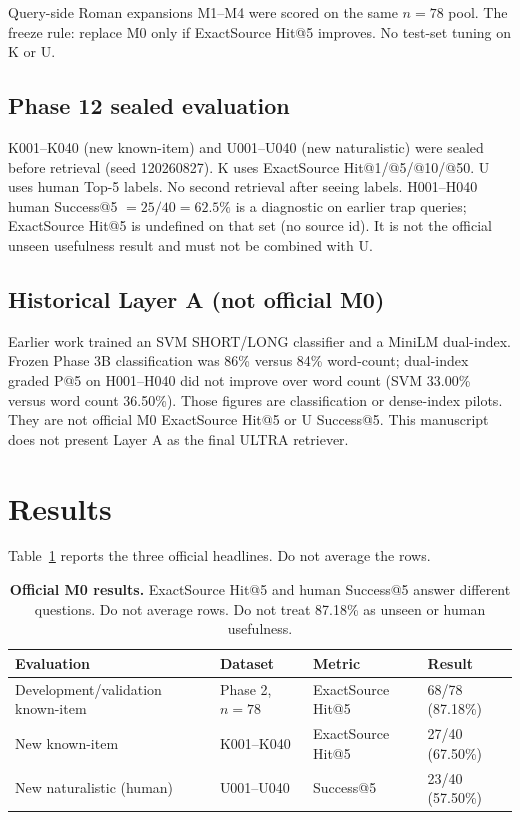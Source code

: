 \documentclass[10pt,letterpaper]{article}
\begin{document}
Query-side Roman expansions M1--M4 were scored on the same \(n=78\) pool. The freeze rule: replace M0 only if ExactSource Hit@5 improves. No test-set tuning on K or U.

\subsection*{Phase 12 sealed evaluation}

K001--K040 (new known-item) and U001--U040 (new naturalistic) were sealed before retrieval (seed 120260827). K uses ExactSource Hit@1/@5/@10/@50. U uses human Top-5 labels. No second retrieval after seeing labels. H001--H040 human Success@5 \(=25/40=62.5\%\) is a diagnostic on earlier trap queries; ExactSource Hit@5 is undefined on that set (no source id). It is not the official unseen usefulness result and must not be combined with U.

\subsection*{Historical Layer A (not official M0)}

Earlier work trained an SVM SHORT/LONG classifier and a MiniLM dual-index. Frozen Phase 3B classification was 86\% versus 84\% word-count; dual-index graded P@5 on H001--H040 did not improve over word count (SVM 33.00\% versus word count 36.50\%). Those figures are classification or dense-index pilots. They are not official M0 ExactSource Hit@5 or U Success@5. This manuscript does not present Layer A as the final ULTRA retriever.

\section*{Results}

Table~\ref{tab:official} reports the three official headlines. Do not average the rows.

\begin{table}[H]
\centering
\caption{\textbf{Official M0 results.} ExactSource Hit@5 and human Success@5 answer different questions. Do not average rows. Do not treat 87.18\% as unseen or human usefulness.}
\label{tab:official}
\begin{tabular}{p{4.2cm}p{3.4cm}p{3.2cm}l}
\toprule
\textbf{Evaluation} & \textbf{Dataset} & \textbf{Metric} & \textbf{Result} \\
\midrule
Development/validation known-item & Phase 2, \(n=78\) & ExactSource Hit@5 & 68/78 (87.18\%) \\
New known-item & K001--K040 & ExactSource Hit@5 & 27/40 (67.50\%) \\
New naturalistic (human) & U001--U040 & Success@5 & 23/40 (57.50\%) \\
\bottomrule
\end{tabular}
\end{table}
\end{document}
